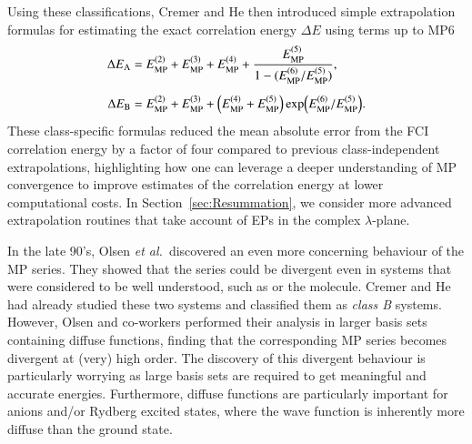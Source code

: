 \documentclass[aps,prb,reprint,noshowkeys,linenumbers,superscriptaddress]{revtex4-1}
\newcommand{\latin}[1]{#1}
\newcommand{\ie}{\latin{i.e.}}
\newcommand{\etal}{\textit{et al.}}
\newcommand{\Emp}{E_{\text{MP}}}
\begin{document}
Using these classifications, Cremer and He then introduced simple extrapolation formulas for estimating the 
exact correlation energy $\Delta E$ using terms up to MP6\cite{Cremer_1996}
\begin{subequations}
\begin{align}
\Delta E_{\text{A}}
    &= \Emp^{(2)} + \Emp^{(3)} + \Emp^{(4)}
     + \frac{\Emp^{(5)}}{1 - (\Emp^{(6)} / \Emp^{(5)})}, 
     \\[5pt]
\Delta E_{\text{B}} 
    &= \Emp^{(2)} + \Emp^{(3)} + \qty(\Emp^{(4)} + \Emp^{(5)}) \exp(\Emp^{(6)} / \Emp^{(5)}).
\end{align}
\end{subequations}
These class-specific formulas reduced the mean absolute error from the FCI correlation energy by a
factor of four compared to previous class-independent extrapolations,
highlighting how one can leverage a deeper understanding of MP convergence to improve estimates of 
the correlation energy at lower computational costs. 
In Section~\ref{sec:Resummation}, we consider more advanced extrapolation routines that take account of EPs in the complex $\lambda$-plane.

In the late 90's, Olsen \etal\ discovered an even more concerning behaviour of the MP series. \cite{Olsen_1996} 
They showed that the series could be divergent even in systems that were considered to be well understood, 
such as  or the  molecule. \cite{Olsen_1996, Christiansen_1996} 
Cremer and He had already studied these two systems and classified them as \textit{class B} systems.\cite{Cremer_1996} 
However, Olsen and co-workers performed their analysis in larger basis sets containing diffuse functions,
finding that the corresponding MP series becomes divergent at (very) high order.
The discovery of this divergent behaviour is particularly worrying as large basis sets 
are required to get meaningful and accurate energies.\cite{Loos_2019d,Giner_2019}
Furthermore, diffuse functions are particularly important for anions and/or Rydberg excited states, where the wave function 
is inherently more diffuse than the ground state.\cite{Loos_2018a,Loos_2020a}
\end{document}
